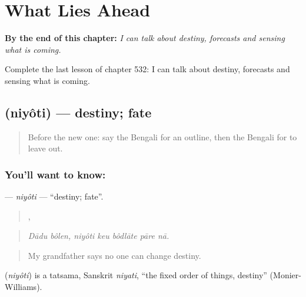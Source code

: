 
\chapter{What Lies Ahead}
\label{ch:bn-what-lies-ahead}

\begin{chapteropening}
\textbf{By the end of this chapter:} \emph{I can talk about destiny, forecasts and sensing what is coming.}

Complete the last lesson of chapter 532: I can talk about destiny, forecasts and sensing what is coming.
\end{chapteropening}

\section[\texorpdfstring{\bn{নিয়তি} (niyôti)}{নিয়তি (niyôti)}]{ (niyôti) — destiny; fate}

\label{lesson:BN-C532-niyoti}



\begin{quote}
Before the new one: say the Bengali for an outline, then the Bengali for to leave out.
\end{quote}

\subsection*{You'll want to know: }
\textbf{} — \emph{niyôti} — \textquotedblleft{}destiny; fate\textquotedblright{}.

\begin{quote}
 ,     
\end{quote}

\begin{quote}
\emph{Dādu bôlen, niyôti keu bôdlāte pāre nā.}
\end{quote}

\begin{quote}
My grandfather says no one can change destiny.
\end{quote}

\begin{cousinweb}
\textbf{} (\emph{niyôti}) is a tatsama, Sanskrit \emph{niyati}, \textquotedblleft{}the fixed order of things, destiny\textquotedblright{} (Monier-Williams).
\end{cousinweb}

